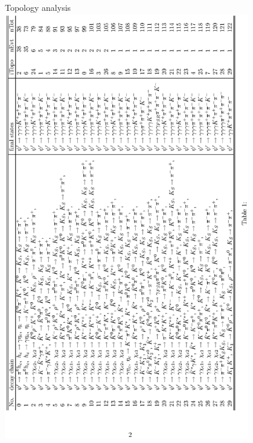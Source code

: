 \documentclass{beamer}
\begin{document}
\begin{frame}{Topology analysis}
\vskip -1.7cm
\includegraphics[width=0.8\textwidth, angle=270]{figures/notice.eps}
\end{frame}


\end{document}
